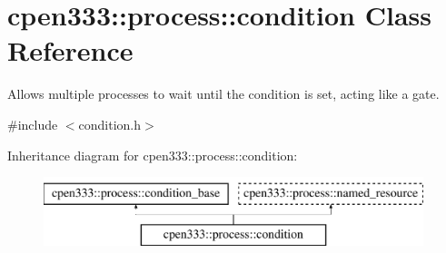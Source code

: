 \hypertarget{classcpen333_1_1process_1_1condition}{}\section{cpen333\+:\+:process\+:\+:condition Class Reference}
\label{classcpen333_1_1process_1_1condition}


Allows multiple processes to wait until the condition is set, acting like a gate.  




{\ttfamily \#include $<$condition.\+h$>$}

Inheritance diagram for cpen333\+:\+:process\+:\+:condition\+:\begin{figure}[H]
\begin{center}
\leavevmode
\includegraphics[height=2.000000cm]{classcpen333_1_1process_1_1condition}
\end{center}
\end{figure}
